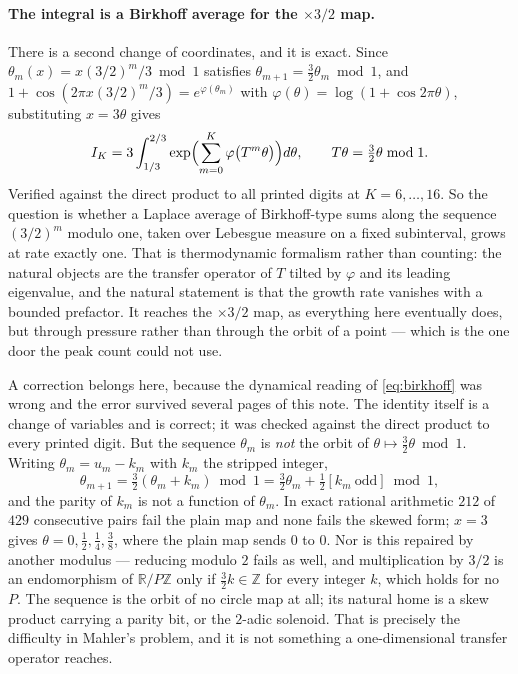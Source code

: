 \documentclass[11pt]{article}
\theoremstyle{remark}
\begin{document}
\paragraph{The integral is a Birkhoff average for the $\times3/2$ map.} There is a second change of
coordinates, and it is exact. Since $\theta_m(x)=x(3/2)^m/3\bmod1$ satisfies
$\theta_{m+1}=\tfrac32\theta_m\bmod1$, and $1+\cos(2\pi x(3/2)^m/3)=e^{\varphi(\theta_m)}$ with
$\varphi(\theta)=\log(1+\cos2\pi\theta)$, substituting $x=3\theta$ gives
\begin{equation}\label{eq:birkhoff}
  I_K=3\int_{1/3}^{2/3}\exp\Bigl(\sum_{m=0}^{K}\varphi\bigl(T^m\theta\bigr)\Bigr)d\theta,
  \qquad T\theta=\tfrac32\theta\bmod1 .
\end{equation}
Verified against the direct product to all printed digits at $K=6,\dots,16$. So the question is whether a
Laplace average of Birkhoff-type sums along the sequence $(3/2)^m$ modulo one, taken over Lebesgue
measure on a fixed subinterval,
grows at rate exactly one. That is thermodynamic formalism rather than counting: the natural objects are
the transfer operator of $T$ tilted by $\varphi$ and its leading eigenvalue, and the natural statement is
that the growth rate vanishes with a bounded prefactor. It reaches the $\times3/2$ map, as everything
here eventually does, but through pressure rather than through the orbit of a point --- which is the one
door the peak count could not use.

A correction belongs here, because the dynamical reading of \eqref{eq:birkhoff} was wrong and the error
survived several pages of this note. The identity itself is a change of variables and is correct; it was
checked against the direct product to every printed digit. But the sequence $\theta_m$ is \emph{not} the
orbit of $\theta\mapsto\tfrac32\theta\bmod1$. Writing $\theta_m=u_m-k_m$ with $k_m$ the stripped integer,
\[
  \theta_{m+1}=\tfrac32(\theta_m+k_m)\bmod1=\tfrac32\theta_m+\tfrac12[k_m\ \text{odd}]\bmod1,
\]
and the parity of $k_m$ is not a function of $\theta_m$. In exact rational arithmetic $212$ of $429$
consecutive pairs fail the plain map and none fails the skewed form; $x=3$ gives
$\theta=0,\tfrac12,\tfrac14,\tfrac38$, where the plain map sends $0$ to $0$. Nor is this repaired by
another modulus --- reducing modulo $2$ fails as well, and multiplication by $3/2$ is an endomorphism of
$\mathbb R/P\mathbb Z$ only if $\tfrac32k\in\mathbb Z$ for every integer $k$, which holds for no $P$. The
sequence is the orbit of no circle map at all; its natural home is a skew product carrying a parity bit,
or the $2$-adic solenoid. That is precisely the difficulty in Mahler's problem, and it is not something a
one-dimensional transfer operator reaches.
\end{document}
